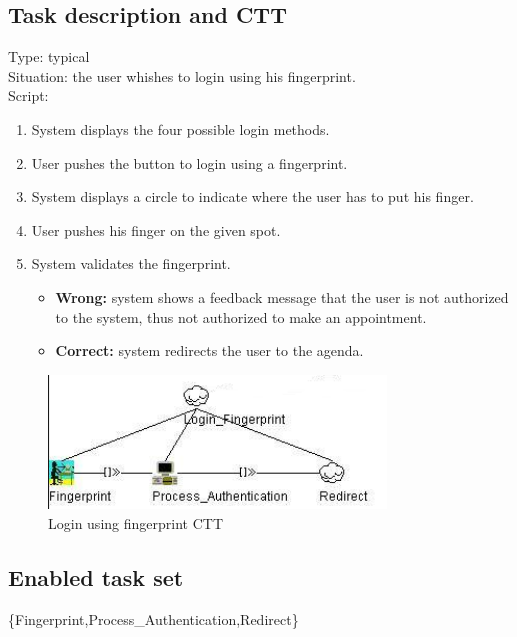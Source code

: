 \documentclass[11pt, a4paper,svglistings]{report}
\begin{document}
\subsection{Task description and CTT}

Type: typical \\
Situation: the user whishes to login using his fingerprint. \\
Script:
\begin{enumerate}
\item System displays the four possible login methods.
\item User pushes the button to login using a fingerprint.
\item System displays a circle to indicate where the user has to put his finger.
\item User pushes his finger on the given spot.
\item System validates the fingerprint.
\begin{itemize}
\item \textbf{Wrong:} system shows a feedback message that the user is not authorized to the system, thus not authorized to make an appointment.
\item \textbf{Correct:} system redirects the user to the agenda.
\end{itemize}
\end{enumerate}

\begin{figure}[H]
\centering
    \includegraphics[width=0.8\textwidth]{LoginFingerprint.png}
  \caption[Fingerprint CTT]{\label{fig:Logout}Login using fingerprint CTT}
\end{figure}

\subsection{Enabled task set}

\{Fingerprint,Process\_Authentication,Redirect\}

\end{document}
